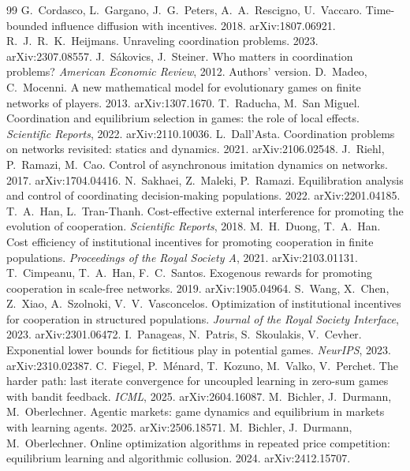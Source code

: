 \documentclass[11pt,a4paper]{article}
\theoremstyle{definition}
\theoremstyle{plain}
\begin{document}
\begin{thebibliography}{99}
 G.~Cordasco, L.~Gargano, J.~G.~Peters, A.~A.~Rescigno, U.~Vaccaro. Time-bounded influence diffusion with incentives. 2018. arXiv:1807.06921.
 R.~J.~R.~K.~Heijmans. Unraveling coordination problems. 2023. arXiv:2307.08557.
 J.~S\'akovics, J.~Steiner. Who matters in coordination problems? \emph{American Economic Review}, 2012. Authors' version.
 D.~Madeo, C.~Mocenni. A new mathematical model for evolutionary games on finite networks of players. 2013. arXiv:1307.1670.
 T.~Raducha, M.~San Miguel. Coordination and equilibrium selection in games: the role of local effects. \emph{Scientific Reports}, 2022. arXiv:2110.10036.
 L.~Dall'Asta. Coordination problems on networks revisited: statics and dynamics. 2021. arXiv:2106.02548.
 J.~Riehl, P.~Ramazi, M.~Cao. Control of asynchronous imitation dynamics on networks. 2017. arXiv:1704.04416.
 N.~Sakhaei, Z.~Maleki, P.~Ramazi. Equilibration analysis and control of coordinating decision-making populations. 2022. arXiv:2201.04185.
 T.~A.~Han, L.~Tran-Thanh. Cost-effective external interference for promoting the evolution of cooperation. \emph{Scientific Reports}, 2018.
 M.~H.~Duong, T.~A.~Han. Cost efficiency of institutional incentives for promoting cooperation in finite populations. \emph{Proceedings of the Royal Society A}, 2021. arXiv:2103.01131.
 T.~Cimpeanu, T.~A.~Han, F.~C.~Santos. Exogenous rewards for promoting cooperation in scale-free networks. 2019. arXiv:1905.04964.
 S.~Wang, X.~Chen, Z.~Xiao, A.~Szolnoki, V.~V.~Vasconcelos. Optimization of institutional incentives for cooperation in structured populations. \emph{Journal of the Royal Society Interface}, 2023. arXiv:2301.06472.
 I.~Panageas, N.~Patris, S.~Skoulakis, V.~Cevher. Exponential lower bounds for fictitious play in potential games. \emph{NeurIPS}, 2023. arXiv:2310.02387.
 C.~Fiegel, P.~M\'enard, T.~Kozuno, M.~Valko, V.~Perchet. The harder path: last iterate convergence for uncoupled learning in zero-sum games with bandit feedback. \emph{ICML}, 2025. arXiv:2604.16087.
 M.~Bichler, J.~Durmann, M.~Oberlechner. Agentic markets: game dynamics and equilibrium in markets with learning agents. 2025. arXiv:2506.18571.
 M.~Bichler, J.~Durmann, M.~Oberlechner. Online optimization algorithms in repeated price competition: equilibrium learning and algorithmic collusion. 2024. arXiv:2412.15707.

\end{thebibliography}
\end{document}

